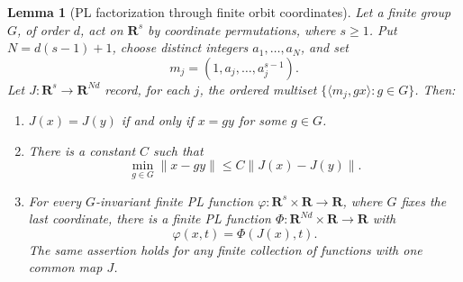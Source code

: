 \documentclass[11pt,a4paper]{article}
\newtheorem{lemma}[theorem]{Lemma}
\theoremstyle{definition}
\theoremstyle{remark}
\newcommand{\R}{\mathbf R}
\begin{document}
\begin{lemma}[PL factorization through finite orbit coordinates]
\label{h22:orbit-pl}
Let a finite group $G$, of order $d$, act on $\R^s$ by coordinate
permutations, where $s\geq1$. Put $N=d(s-1)+1$, choose distinct integers
$a_1,\ldots,a_N$, and set
\[
 m_j=(1,a_j,\ldots,a_j^{s-1}).
\]
Let $J:\R^s\longrightarrow\R^{Nd}$ record, for each $j$, the ordered
multiset $\{\langle m_j,gx\rangle:g\in G\}$. Then:
\begin{enumerate}
\item $J(x)=J(y)$ if and only if $x=gy$ for some $g\in G$.
\item There is a constant $C$ such that
\[
 \min_{g\in G}\|x-gy\|\leq C\|J(x)-J(y)\|.
\]
\item For every $G$-invariant finite PL function
$\varphi:\R^s\times\R\to\R$, where $G$ fixes the last coordinate,
there is a finite PL function $\Phi:\R^{Nd}\times\R\to\R$ with
\[
                   \varphi(x,t)=\Phi(J(x),t).
\]
The same assertion holds for any finite collection of functions with
one common map $J$.
\end{enumerate}
\end{lemma}
\end{document}
